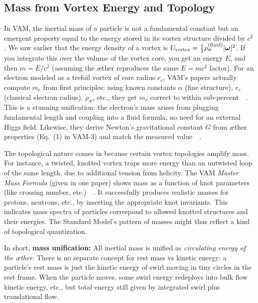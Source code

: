 \documentclass[preprint]{revtex4-2}
\begin{document}
    \subsection{Mass from Vortex Energy and Topology}
    In VAM, the inertial mass of a particle is not a fundamental constant but an emergent property equal to the energy stored in its vortex structure divided by $c^2$. We saw earlier that the energy density of a vortex is $U_{\rm vortex} = \frac{1}{2}\rho_{\text{\ae}}^{(\text{fluid})}|\boldsymbol{\omega}|^2$. If you integrate this over the volume of the vortex core, you get an energy $E$, and then $m = E/c^2$ (assuming the æther reproduces the same $E=mc^2$ factor). For an electron modeled as a trefoil vortex of core radius $r_c$, VAM’s papers actually compute $m_e$ from first principles: using known constants $\alpha$ (fine structure), $r_c$ (classical electron radius), $\rho_{\text{\ae}}$, etc., they get $m_e$ correct to within sub-percent~\cite{reference_139}~\cite{reference_140}. This is a stunning unification: the electron’s mass arises from plugging fundamental length and coupling into a fluid formula, no need for an external Higgs field. Likewise, they derive Newton’s gravitational constant $G$ from æther properties (Eq.~(1) in VAM-3) and match the measured value~\cite{reference_141}~\cite{reference_142}.

    The topological nature comes in because certain vortex topologies amplify mass. For instance, a twisted, knotted vortex traps more energy than an untwisted loop of the same length, due to additional tension from helicity. The VAM \emph{Master Mass Formula} (given in one paper) shows mass as a function of knot parameters (like crossing number, etc.)~\cite{reference_143}~\cite{reference_144}. It successfully produces realistic masses for protons, neutrons, etc., by inserting the appropriate knot invariants. This indicates mass spectra of particles correspond to allowed knotted structures and their energies. The Standard Model’s pattern of masses might thus reflect a kind of topological quantization.

    In short, \textbf{mass unification:} All inertial mass is unified as \emph{circulating energy of the æther}. There is no separate concept for rest mass vs kinetic energy: a particle’s rest mass is just the kinetic energy of swirl moving in tiny circles in the rest frame. When the particle moves, some swirl energy redeploys into bulk flow kinetic energy, etc., but total energy still given by integrated swirl plus translational flow.
\end{document}

